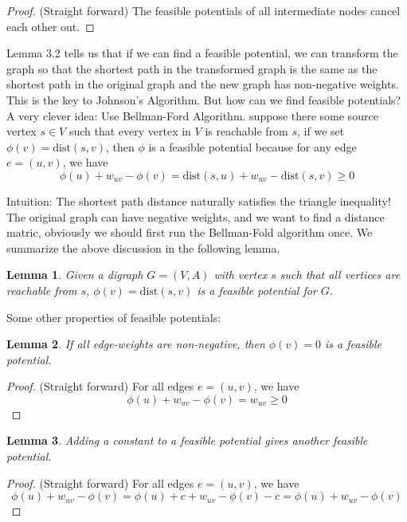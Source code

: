 \documentclass[11pt]{article}
\theoremstyle{plain}
\newtheorem{lemma}{Lemma}[section]
\begin{document}
  \begin{proof}
    (Straight forward) The feasible potentials of all intermediate nodes cancel each other out.
  \end{proof}

  Lemma 3.2 tells us that if we can find a feasible potential, we can transform the graph so that the shortest path
  in the transformed graph is the same as the shortest path in the original graph and the new graph has non-negative weights.
  This is the key to Johnson's Algorithm. But how can we find feasible potentials? A very clever idea: Use Bellman-Ford Algorithm.
  suppose there some source vertex $s \in V$ such that every vertex in $V$ is reachable from $s$, if we set $\phi(v) = \text{dist}(s, v)$,
  then $\phi$ is a feasible potential because for any edge $e = (u, v)$, we have
  \[
    \phi(u) + w_{uv} - \phi(v) = \text{dist}(s, u) + w_{uv} - \text{dist}(s, v) \geq 0
  \]

  Intuition: The shortest path distance naturally satisfies the triangle inequality! The original graph can have negative weights,
  and we want to find a distance matric, obviously we should first run the Bellman-Fold algorithm once. We summarize the above discussion
  in the following lemma.

  \begin{lemma}
    Given a digraph $G = (V, A)$ with vertex $s$ such that all
    vertices are reachable from $s$, $\phi(v) = \text{dist}(s, v)$ is a feasible potential for $G$.
  \end{lemma}

  Some other properties of feasible potentials:
  \begin{lemma}
    If all edge-weights are non-negative, then $\phi(v) = 0$ is a feasible potential.
  \end{lemma}
  \begin{proof}
    (Straight forward) For all edges $e = (u, v)$, we have 
    \[
      \phi(u) + w_{uv} - \phi(v) = w_{uv} \geq 0
    \]
  \end{proof}

  \begin{lemma}
    Adding a constant to a feasible potential gives another feasible potential.
  \end{lemma}
  \begin{proof}
    (Straight forward) For all edges $e = (u, v)$, we have 
    \[
      \phi(u) + w_{uv} - \phi(v) = \phi(u) + c + w_{uv} - \phi(v) - c = \phi(u) + w_{uv} - \phi(v)
    \]
  \end{proof}
\end{document}
